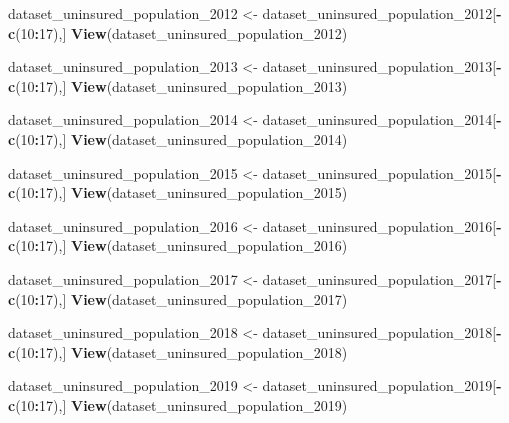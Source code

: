 \documentclass[
]{article}
\newenvironment{Shaded}{\begin{snugshade}}{\end{snugshade}}
\newcommand{\DecValTok}[1]{\textcolor[rgb]{0.00,0.00,0.81}{#1}}
\newcommand{\FunctionTok}[1]{\textcolor[rgb]{0.13,0.29,0.53}{\textbf{#1}}}
\newcommand{\NormalTok}[1]{#1}
\newcommand{\OtherTok}[1]{\textcolor[rgb]{0.56,0.35,0.01}{#1}}
\newcommand{\SpecialCharTok}[1]{\textcolor[rgb]{0.81,0.36,0.00}{\textbf{#1}}}
\begin{document}
\begin{Shaded}
\begin{Highlighting}[]
\NormalTok{dataset\_uninsured\_population\_2012 }\OtherTok{\textless{}{-}}\NormalTok{ dataset\_uninsured\_population\_2012[}\SpecialCharTok{{-}}\FunctionTok{c}\NormalTok{(}\DecValTok{10}\SpecialCharTok{:}\DecValTok{17}\NormalTok{),]}
\FunctionTok{View}\NormalTok{(dataset\_uninsured\_population\_2012)}

\NormalTok{dataset\_uninsured\_population\_2013 }\OtherTok{\textless{}{-}}\NormalTok{ dataset\_uninsured\_population\_2013[}\SpecialCharTok{{-}}\FunctionTok{c}\NormalTok{(}\DecValTok{10}\SpecialCharTok{:}\DecValTok{17}\NormalTok{),]}
\FunctionTok{View}\NormalTok{(dataset\_uninsured\_population\_2013)}

\NormalTok{dataset\_uninsured\_population\_2014 }\OtherTok{\textless{}{-}}\NormalTok{ dataset\_uninsured\_population\_2014[}\SpecialCharTok{{-}}\FunctionTok{c}\NormalTok{(}\DecValTok{10}\SpecialCharTok{:}\DecValTok{17}\NormalTok{),]}
\FunctionTok{View}\NormalTok{(dataset\_uninsured\_population\_2014)}

\NormalTok{dataset\_uninsured\_population\_2015 }\OtherTok{\textless{}{-}}\NormalTok{ dataset\_uninsured\_population\_2015[}\SpecialCharTok{{-}}\FunctionTok{c}\NormalTok{(}\DecValTok{10}\SpecialCharTok{:}\DecValTok{17}\NormalTok{),]}
\FunctionTok{View}\NormalTok{(dataset\_uninsured\_population\_2015)}

\NormalTok{dataset\_uninsured\_population\_2016 }\OtherTok{\textless{}{-}}\NormalTok{ dataset\_uninsured\_population\_2016[}\SpecialCharTok{{-}}\FunctionTok{c}\NormalTok{(}\DecValTok{10}\SpecialCharTok{:}\DecValTok{17}\NormalTok{),]}
\FunctionTok{View}\NormalTok{(dataset\_uninsured\_population\_2016)}

\NormalTok{dataset\_uninsured\_population\_2017 }\OtherTok{\textless{}{-}}\NormalTok{ dataset\_uninsured\_population\_2017[}\SpecialCharTok{{-}}\FunctionTok{c}\NormalTok{(}\DecValTok{10}\SpecialCharTok{:}\DecValTok{17}\NormalTok{),]}
\FunctionTok{View}\NormalTok{(dataset\_uninsured\_population\_2017)}

\NormalTok{dataset\_uninsured\_population\_2018 }\OtherTok{\textless{}{-}}\NormalTok{ dataset\_uninsured\_population\_2018[}\SpecialCharTok{{-}}\FunctionTok{c}\NormalTok{(}\DecValTok{10}\SpecialCharTok{:}\DecValTok{17}\NormalTok{),]}
\FunctionTok{View}\NormalTok{(dataset\_uninsured\_population\_2018)}

\NormalTok{dataset\_uninsured\_population\_2019 }\OtherTok{\textless{}{-}}\NormalTok{ dataset\_uninsured\_population\_2019[}\SpecialCharTok{{-}}\FunctionTok{c}\NormalTok{(}\DecValTok{10}\SpecialCharTok{:}\DecValTok{17}\NormalTok{),]}
\FunctionTok{View}\NormalTok{(dataset\_uninsured\_population\_2019)}


\end{Highlighting}
\end{Shaded}
\end{document}
